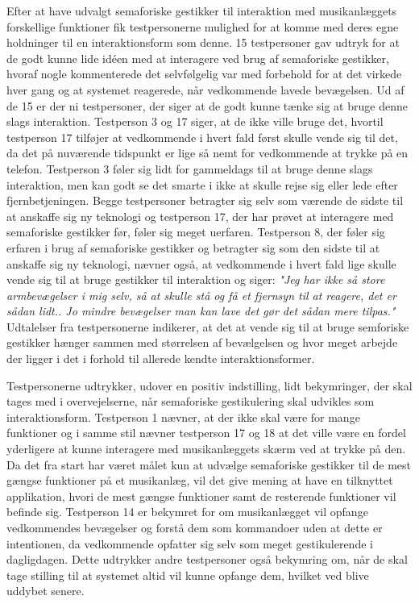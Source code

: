 Efter at have udvalgt semaforiske gestikker til interaktion med musikanlæggets forskellige funktioner fik testpersonerne mulighed for at komme med deres egne holdninger til en interaktionsform som denne. 15 testpersoner gav udtryk for at de godt kunne lide idéen med at interagere ved brug af semaforiske gestikker, hvoraf nogle kommenterede det selvfølgelig var med forbehold for at det virkede hver gang og at systemet reagerede, når vedkommende lavede bevægelsen. Ud af de 15 er der ni testpersoner, der siger at de godt kunne tænke sig at bruge denne slags interaktion. Testperson 3 og 17 siger, at de ikke ville bruge det, hvortil testperson 17 tilføjer at vedkommende i hvert fald først skulle vende sig til det, da det på nuværende tidspunkt er lige så nemt for vedkommende at trykke på en telefon. Testperson 3 føler sig lidt for gammeldags til at bruge denne slags interaktion, men kan godt se det smarte i ikke at skulle rejse sig eller lede efter fjernbetjeningen. Begge testpersoner betragter sig selv som værende de sidste til at anskaffe sig ny teknologi og testperson 17, der har prøvet at interagere med semaforiske gestikker før, føler sig meget uerfaren. Testperson 8, der føler sig erfaren i brug af semaforiske gestikker og betragter sig som den sidste til at anskaffe sig ny teknologi,  nævner også, at vedkommende i hvert fald lige skulle vende sig til at bruge gestikker til interaktion og siger: \textsl{"Jeg har ikke så store armbevægelser i mig selv, så at skulle stå og få et fjernsyn til at reagere, det er sådan lidt.. Jo mindre bevægelser man kan lave det gør det sådan mere tilpas."} Udtalelser fra testpersonerne indikerer, at det at vende sig til at bruge semforiske gestikker hænger sammen med størrelsen af bevælgelsen og hvor meget arbejde der ligger i det i forhold til allerede kendte interaktionsformer. 

Testpersonerne udtrykker, udover en positiv indstilling, lidt bekymringer, der skal tages med i overvejelserne, når semaforiske gestikulering skal udvikles som interaktionsform. Testperson 1 nævner, at der ikke skal være for mange funktioner og i samme stil nævner testperson 17 og 18 at det ville være en fordel yderligere at kunne interagere med musikanlæggets skærm ved at trykke på den. Da det fra start har været målet kun at udvælge semaforiske gestikker til de mest gængse funktioner på et musikanlæg, vil det give mening at have en tilknyttet applikation, hvori de mest gængse funktioner samt de resterende funktioner vil befinde sig. Testperson 14 er bekymret for om musikanlægget vil opfange vedkommendes bevægelser og forstå dem som kommandoer uden at dette er intentionen, da vedkommende opfatter sig selv som meget gestikulerende i dagligdagen. Dette udtrykker andre testpersoner også bekymring om, når de skal tage stilling til at systemet altid vil kunne opfange dem, hvilket ved blive uddybet senere. 

